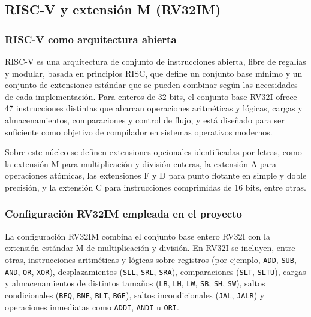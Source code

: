 \subsection{RISC-V y extensión M (RV32IM)}

\subsubsection{RISC-V como arquitectura abierta}

RISC-V es una arquitectura de conjunto de instrucciones abierta, libre de regalías y modular, basada en principios RISC, que define un conjunto base mínimo y un conjunto de extensiones estándar que se pueden combinar según las necesidades de cada implementación. Para enteros de 32 bits, el conjunto base RV32I ofrece 47 instrucciones distintas que abarcan operaciones aritméticas y lógicas, cargas y almacenamientos, comparaciones y control de flujo, y está diseñado para ser suficiente como objetivo de compilador en sistemas operativos modernos.\parencite{RISCV2019Manual}

Sobre este núcleo se definen extensiones opcionales identificadas por letras, como la extensión M para multiplicación y división enteras, la extensión A para operaciones atómicas, las extensiones F y D para punto flotante en simple y doble precisión, y la extensión C para instrucciones comprimidas de 16 bits, entre otras.


\subsubsection{Configuración RV32IM empleada en el proyecto}

La configuración RV32IM combina el conjunto base entero RV32I con la extensión estándar M de multiplicación y división. En RV32I se incluyen, entre otras, instrucciones aritméticas y lógicas sobre registros (por ejemplo, \texttt{ADD}, \texttt{SUB}, \texttt{AND}, \texttt{OR}, \texttt{XOR}), desplazamientos (\texttt{SLL}, \texttt{SRL}, \texttt{SRA}), comparaciones (\texttt{SLT}, \texttt{SLTU}), cargas y almacenamientos de distintos tamaños (\texttt{LB}, \texttt{LH}, \texttt{LW}, \texttt{SB}, \texttt{SH}, \texttt{SW}), saltos condicionales (\texttt{BEQ}, \texttt{BNE}, \texttt{BLT}, \texttt{BGE}), saltos incondicionales (\texttt{JAL}, \texttt{JALR}) y operaciones inmediatas como \texttt{ADDI}, \texttt{ANDI} u \texttt{ORI}.\parencite{RISCV2019Manual}


